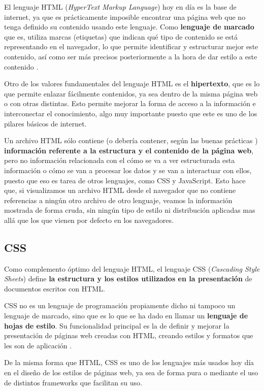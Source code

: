 El lenguaje HTML (\textit{HyperText Markup Language}) hoy en día es la base de internet, ya que es prácticamente imposible encontrar una página web que no tenga definido su contenido usando este lenguaje. Como \textbf{lenguaje de marcado} que es, utiliza marcas (etiquetas) que indican qué tipo de contenido se está representando en el navegador, lo que permite identificar y estructurar mejor este contenido, así como ser más precisos posteriormente a la hora de dar estilo a este contenido \cite{mdn:html}.

Otro de los valores fundamentales del lenguaje HTML es el \textbf{hipertexto}, que es lo que permite enlazar fácilmente contenidos, ya sea dentro de la misma página web o con otras distintas. Esto permite mejorar la forma de acceso a la información e interconectar el conocimiento, algo muy importante puesto que este es uno de los pilares básicos de internet.

Un archivo HTML sólo contiene (o debería contener, según las buenas prácticas \cite{midudev:html}) \textbf{información referente a la estructura y el contenido de la página web}, pero no información relacionada con el cómo se va a ver estructurada esta información o cómo se van a procesar los datos y se van a interactuar con ellos, puesto que eso es tarea de otros lenguajes, como CSS y JavaScript. Esto hace que, si visualizamos un archivo HTML desde el navegador que no contiene referencias a ningún otro archivo de otro lenguaje, veamos la información mostrada de forma cruda, sin ningún tipo de estilo ni distribución aplicadas mas allá que los que vienen por defecto en los navegadores.

\subsection{CSS}

Como complemento óptimo del lenguaje HTML, el lenguaje CSS (\textit{Cascading Style Sheets}) define \textbf{la estructura y los estilos utilizados en la presentación} de documentos escritos con HTML.

CSS no es un lenguaje de programación propiamente dicho ni tampoco un lenguaje de marcado, sino que es lo que se ha dado en llamar un \textbf{lenguaje de hojas de estilo}. Su funcionalidad principal es la de definir y mejorar la presentación de páginas web creadas con HTML, creando estilos y formatos que les son de aplicación \cite{mdn:css}.

De la misma forma que HTML, CSS es uno de los lenguajes más usados hoy día en el diseño de los estilos de páginas web, ya sea de forma pura o mediante el uso de distintos frameworks que facilitan su uso.

